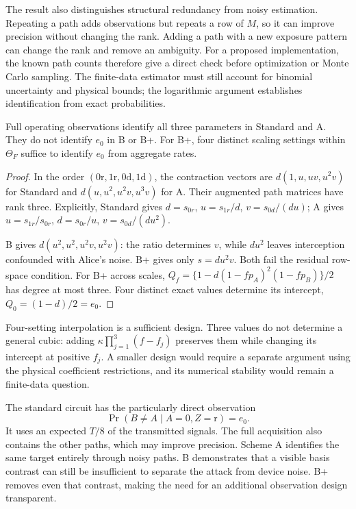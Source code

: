\documentclass[manuscript,screen,review,anonymous]{acmart}
\begin{document}
The result also distinguishes structural redundancy from noisy estimation.
Repeating a path adds observations but repeats a row of $M$, so it can improve
precision without changing the rank. Adding a path with a new exposure pattern
can change the rank and remove an ambiguity. For a proposed implementation,
the known path counts therefore give a direct check before optimization or
Monte Carlo sampling. The finite-data estimator must still account for
binomial uncertainty and physical bounds; the logarithmic argument establishes
identification from exact probabilities.

\begin{corollary}
\label{cor:circuits}
Full operating observations identify all three parameters in Standard and A.
They do not identify $e_0$ in B or B+. For B+, four distinct scaling settings
within $\Theta_F$ suffice to identify $e_0$ from aggregate rates.
\end{corollary}
\begin{proof}
In the order $(0\mathrm r,1\mathrm r,0\mathrm d,1\mathrm d)$, the contraction
vectors are $d(1,u,uv,u^2v)$ for Standard and $d(u,u^2,u^2v,u^3v)$ for A.
Their augmented path matrices have rank three. Explicitly, Standard gives
$d=s_{0r}$, $u=s_{1r}/d$, $v=s_{0d}/(du)$; A gives
$u=s_{1r}/s_{0r}$, $d=s_{0r}/u$, $v=s_{0d}/(du^2)$.

B gives $d(u^2,u^2,u^2v,u^2v)$: the ratio determines $v$, while
$du^2$ leaves interception confounded with Alice's noise.
B+ gives only $s=du^2v$. Both fail the residual row-space condition.
For B+ across scales,
$Q_f=\{1-d(1-fp_A)^2(1-fp_B)\}/2$ has degree at most three.
Four distinct exact values determine its intercept,
$Q_0=(1-d)/2=e_0$.
\end{proof}

Four-setting interpolation is a sufficient design. Three values do not
determine a general cubic: adding $\kappa\prod_{j=1}^3(f-f_j)$ preserves
them while changing its intercept at positive $f_j$. A smaller design would
require a separate argument using the physical coefficient restrictions,
and its numerical stability would remain a finite-data question.

The standard circuit has the particularly direct observation
\begin{equation}
 \Pr(B\ne A\mid A=0,Z=\mathrm r)=e_0.
 \label{eq:subset}
\end{equation}
It uses an expected $T/8$ of the transmitted signals. The full acquisition
also contains the other paths, which may improve precision. Scheme A
identifies the same target entirely through noisy paths. B demonstrates
that a visible basis contrast can still be insufficient to separate the
attack from device noise. B+ removes even that contrast, making the need
for an additional observation design transparent.
\end{document}
